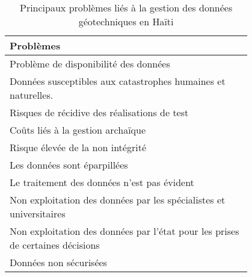\par    
\begin{table}
        \centering
        \begin{tabular}{|p{0.80\linewidth}|}
        \hline
                \textbf{Problèmes} \\
                \hline
                    Problème de disponibilité des données
                         \\
                \hline
                Données susceptibles aux catastrophes humaines et naturelles.
                    \\
                \hline
                Risques de récidive des réalisations de test
                    \\
                \hline
                Coûts liés à la gestion archaïque
                    \\
                \hline
                Risque élevée de la non intégrité
                        \\
                \hline
                Les données sont éparpillées
                        \\
                \hline
                Le traitement des données n'est pas évident
                        \\
                \hline
                Non exploitation des données par les spécialistes et universitaires
                        \\
                \hline 
                Non exploitation des données par l'état pour les prises de certaines décisions
                        \\
                \hline 
                Données non sécurisées
                        \\
                \hline 
        \end{tabular}
        \caption{Principaux problèmes liés à la gestion des données géotechniques en Haïti} \label{tab:problemes}
\end{table}
\par